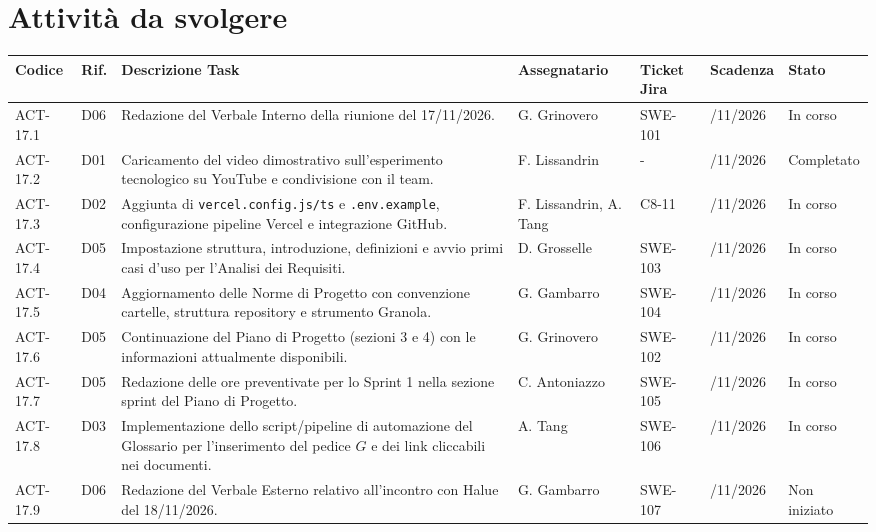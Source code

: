 \newpage

\section{Attività da svolgere}

\renewcommand{\arraystretch}{1.3}
\noindent
{\small\setlength{\tabcolsep}{3pt}%
\begin{tabularx}{\textwidth}{|>{\raggedright\arraybackslash}p{1.65cm}|>{\raggedright\arraybackslash}p{0.75cm}|>{\raggedright\arraybackslash}X|>{\raggedright\arraybackslash}p{2.3cm}|>{\raggedright\arraybackslash}p{1.45cm}|>{\raggedright\arraybackslash}p{1.8cm}|>{\raggedright\arraybackslash}p{1.85cm}|}
    \hline
    \textbf{Codice} & \textbf{Rif.} & \textbf{Descrizione Task} & \textbf{Assegnatario} & \textbf{Ticket Jira} & \textbf{Scadenza} & \textbf{Stato} \\
    \hline
    ACT-17.1 & D06 & Redazione del Verbale Interno della riunione del 17/11/2026. & G. Grinovero & SWE-101 & 24/11/2026 & In corso \\
    \hline
    ACT-17.2 & D01 & Caricamento del video dimostrativo sull'esperimento tecnologico su YouTube e condivisione con il team. & F. Lissandrin & - & 24/11/2026 & Completato \\
    \hline
    ACT-17.3 & D02 & Aggiunta di \texttt{vercel.config.js/ts} e \texttt{.env.example}, configurazione pipeline Vercel e integrazione GitHub. & F. Lissandrin, A. Tang & C8-11 & 24/11/2026 & In corso \\
    \hline
    ACT-17.4 & D05 & Impostazione struttura, introduzione, definizioni e avvio primi casi d'uso per l'Analisi dei Requisiti. & D. Grosselle & SWE-103 & 24/11/2026 & In corso \\
    \hline
    ACT-17.5 & D04 & Aggiornamento delle Norme di Progetto con convenzione cartelle, struttura repository e strumento Granola. & G. Gambarro & SWE-104 & 24/11/2026 & In corso \\
    \hline
    ACT-17.6 & D05 & Continuazione del Piano di Progetto (sezioni 3 e 4) con le informazioni attualmente disponibili. & G. Grinovero & SWE-102 & 24/11/2026 & In corso \\
    \hline
    ACT-17.7 & D05 & Redazione delle ore preventivate per lo Sprint 1 nella sezione sprint del Piano di Progetto. & C. Antoniazzo & SWE-105 & 24/11/2026 & In corso \\
    \hline
    ACT-17.8 & D03 & Implementazione dello script/pipeline di automazione del Glossario per l'inserimento del pedice $G$ e dei link cliccabili nei documenti. & A. Tang & SWE-106 & 24/11/2026 & In corso \\
    \hline
    ACT-17.9 & D06 & Redazione del Verbale Esterno relativo all'incontro con Halue del 18/11/2026. & G. Gambarro & SWE-107 & 20/11/2026 & Non iniziato \\
    \hline
\end{tabularx}}
